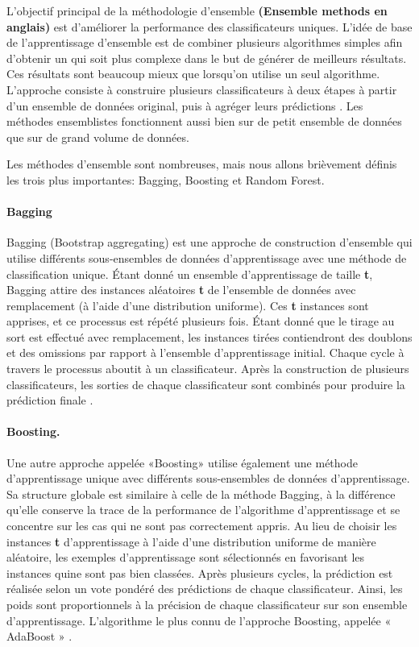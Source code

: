 \documentclass[12pt, french]{report}
\begin{document}
L'objectif principal de la méthodologie d'ensemble \textbf{(Ensemble methods en anglais)} est d'améliorer la performance des classificateurs uniques. L'idée de base de l'apprentissage d'ensemble est de combiner plusieurs algorithmes simples afin d'obtenir un qui soit plus complexe dans le but de générer de meilleurs résultats. Ces résultats sont beaucoup mieux que lorsqu'on utilise un seul algorithme.  L'approche consiste à construire plusieurs classificateurs à deux étapes à partir d'un ensemble de données original, puis à agréger leurs prédictions \cite{key1, key39}. Les méthodes ensemblistes fonctionnent aussi bien sur de petit ensemble de données que sur de grand volume de données.

Les méthodes d'ensemble sont nombreuses, mais nous allons brièvement définis les trois plus importantes: Bagging, Boosting et Random Forest. 

\paragraph{Bagging}
Bagging (Bootstrap aggregating) est une approche de construction d'ensemble qui 
utilise différents sous-ensembles de données d’apprentissage avec une  méthode  de classification unique.  Étant  donné  un  ensemble  d’apprentissage  de  taille \textbf{t}, Bagging attire des instances aléatoires \textbf{t} de l'ensemble de données avec remplacement (à l'aide d'une distribution uniforme). Ces \textbf{t} instances sont apprises, et ce processus est répété plusieurs fois. Étant donné que le tirage au sort est effectué avec remplacement, les   instances   tirées   contiendront des   doublons   et   des   omissions   par   rapport   à l'ensemble  d'apprentissage initial.  Chaque  cycle  à  travers  le  processus  aboutit  à  un classificateur.  Après  la  construction  de  plusieurs  classificateurs,  les  sorties  de  chaque classificateur sont combinés pour produire la prédiction finale \cite{key27}. 
\paragraph{Boosting.}
Une  autre  approche  appelée  «Boosting»  utilise  également une  méthode d'apprentissage  unique  avec  différents  sous-ensembles  de  données  d’apprentissage. Sa structure globale est similaire à celle de la méthode Bagging, à la différence qu’elle  conserve  la  trace  de  la  performance  de  l'algorithme  d'apprentissage  et  se concentre  sur  les  cas  qui  ne  sont  pas  correctement  appris.  Au  lieu  de  choisir  les instances \textbf{t} d’apprentissage à l'aide d'une distribution uniforme de manière aléatoire, les exemples d’apprentissage sont sélectionnés en favorisant les instances quine sont pas  bien  classées.  Après  plusieurs  cycles,  la  prédiction  est  réalisée  selon  un  vote pondéré des prédictions de chaque classificateur. Ainsi, les poids sont proportionnels à la précision de chaque classificateur sur son ensemble d'apprentissage. L’algorithme le plus connu de l’approche Boosting, appelée « AdaBoost » \cite{key27}.
\end{document}
